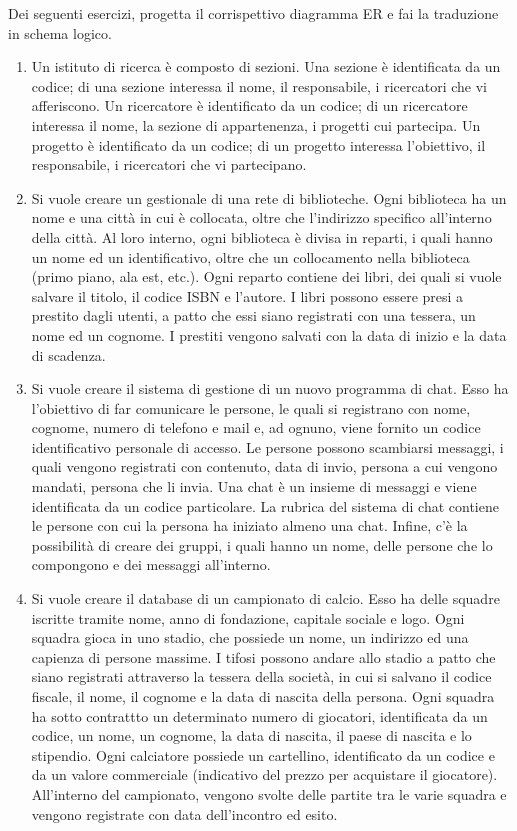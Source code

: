 \documentclass{article}
\begin{document}
	
\begin{center}
\end{center}

Dei seguenti esercizi, progetta il corrispettivo diagramma ER e fai la traduzione in schema logico.

\begin{enumerate}
	\item Un istituto di ricerca è composto di sezioni. Una sezione è identificata da un codice; di una sezione interessa il nome, il responsabile, i ricercatori che vi afferiscono. Un ricercatore è identificato da un codice; di un ricercatore interessa il nome, la sezione di appartenenza, i progetti cui partecipa. Un progetto è identificato da un codice; di un progetto interessa l'obiettivo, il responsabile, i ricercatori che vi partecipano.
	\item Si vuole creare un gestionale di una rete di biblioteche. Ogni biblioteca ha un nome e una città in cui è collocata, oltre che l'indirizzo specifico all'interno della città. Al loro interno, ogni biblioteca è divisa in reparti, i quali hanno un nome ed un identificativo, oltre che un collocamento nella biblioteca (primo piano, ala est, etc.). Ogni reparto contiene dei libri, dei quali si vuole salvare il titolo, il codice ISBN e l'autore. I libri possono essere presi a prestito dagli utenti, a patto che essi siano registrati con una tessera, un nome ed un cognome. I prestiti vengono salvati con la data di inizio e la data di scadenza.
	\item Si vuole creare il sistema di gestione di un nuovo programma di chat. Esso ha l'obiettivo di far comunicare le persone, le quali si registrano con nome, cognome, numero di telefono e mail e, ad ognuno, viene fornito un codice identificativo personale di accesso. Le persone possono scambiarsi messaggi, i quali vengono registrati con contenuto, data di invio, persona a cui vengono mandati, persona che li invia. Una chat è un insieme di messaggi e viene identificata da un codice particolare. La rubrica del sistema di chat contiene le persone con cui la persona ha iniziato almeno una chat. Infine, c'è la possibilità di creare dei gruppi, i quali hanno un nome, delle persone che lo compongono e dei messaggi all'interno.
	\item Si vuole creare il database di un campionato di calcio. Esso ha delle squadre iscritte tramite nome, anno di fondazione, capitale sociale e logo. Ogni squadra gioca in uno stadio, che possiede un nome, un indirizzo ed una capienza di persone massime. I tifosi possono andare allo stadio a patto che siano registrati attraverso la tessera della società, in cui si salvano il codice fiscale, il nome, il cognome e la data di nascita della persona. Ogni squadra ha sotto contrattto un determinato numero di giocatori, identificata da un codice, un nome, un cognome, la data di nascita, il paese di nascita e lo stipendio. Ogni calciatore possiede un cartellino, identificato da un codice e da un valore commerciale (indicativo del prezzo per acquistare il giocatore). All'interno del campionato, vengono svolte delle partite tra le varie squadra e vengono registrate con data dell'incontro ed esito.
\end{enumerate}
\end{document}
